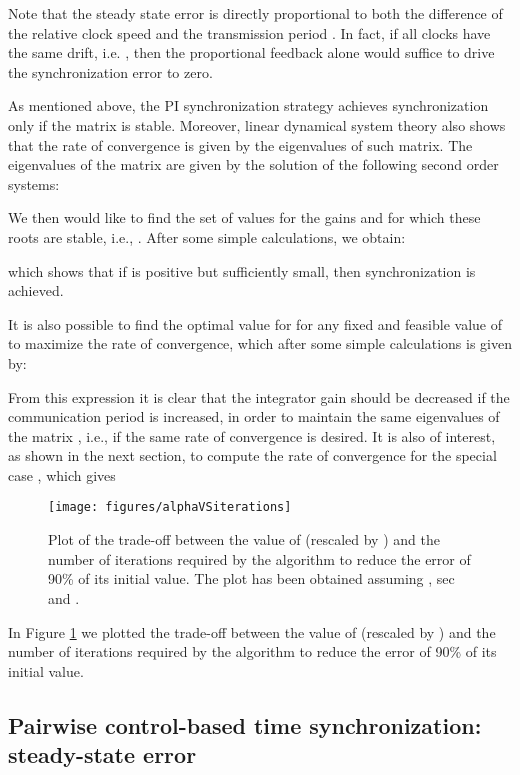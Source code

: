 \documentclass[english,a4paper,10pt,final]{article}
\numberwithin{equation}{section}
\numberwithin{figure}{section}
\begin{document}
Note that the steady state error is directly proportional to both the difference of the relative clock speed and the transmission period . In fact, if all clocks have the same drift, i.e. , then the proportional feedback alone would suffice to drive the synchronization error to zero. 

As mentioned above, the PI synchronization strategy achieves synchronization only if the matrix  is stable. Moreover, linear dynamical system theory also shows that the rate of convergence is given by the eigenvalues of such matrix. The eigenvalues of the matrix  are given by the solution of the following second order systems:

We then would like to find the set of values for the gains  and  for which these roots are stable, i.e., . After some simple calculations, we obtain:

which shows that if  is positive but sufficiently small, then synchronization is achieved.

 It is also possible to find the optimal value for  for any fixed and feasible value of  to maximize the rate of convergence, which after some simple calculations is given by:

From this expression it is clear that the integrator gain  should be decreased if the communication period  is increased, in order to maintain the same eigenvalues of the matrix , i.e., if the same rate of convergence is desired. 
It is also of interest, as shown in the next section, to compute the rate of convergence for the special case , which gives



\begin{figure} 
\center

\texttt{[image: figures/alphaVSiterations]} 

\caption{\label{fig:alphaVSiterations} Plot of the trade-off between the value of  (rescaled by ) and the number of iterations required by the algorithm to reduce the error of 90\% of its initial value. The plot has been obtained assuming , sec and .}
\end{figure}

In Figure \ref{fig:alphaVSiterations} we plotted the trade-off between the value of  (rescaled by ) and the number of iterations required by the algorithm to reduce the error of 90\% of its initial value. 


\subsection{Pairwise control-based time synchronization: steady-state error}
\label{sec:noise2}
\end{document}
